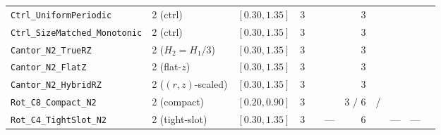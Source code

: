 \begin{table}[!htbp]
{\begin{tabular}{llccccrrrrr}
\texttt{Ctrl\_UniformPeriodic} & 2 (ctrl) & $[0.30, 1.35]$ & 3 & \NatureCtrlUniformperiodicFullToothPlanformAreaUmtwo{} & \NatureCtrlUniformperiodicFullToothPlanformPerimeterUm{} & 3 & \NatureCtrlUniformperiodicFRepPn{} & \NatureCtrlUniformperiodicFRepPnPerToothAreaUmtwo{} & \NatureCtrlUniformperiodicFRepPnPerToothPerimeterUm{} & \NatureCtrlUniformperiodicFAttPn{} \\
\texttt{Ctrl\_SizeMatched\_Monotonic} & 2 (ctrl) & $[0.30, 1.35]$ & 3 & \NatureCtrlSizematchedMonotonicFullToothPlanformAreaUmtwo{} & \NatureCtrlSizematchedMonotonicFullToothPlanformPerimeterUm{} & 3 & \NatureCtrlSizematchedMonotonicFRepPn{} & \NatureCtrlSizematchedMonotonicFRepPnPerToothAreaUmtwo{} & \NatureCtrlSizematchedMonotonicFRepPnPerToothPerimeterUm{} & \NatureCtrlSizematchedMonotonicFAttPn{} \\
\texttt{Cantor\_N2\_TrueRZ} & 2 ($H_2=H_1/3$) & $[0.30, 1.35]$ & 3 & \NatureCantorNtwoTruerzFullToothPlanformAreaUmtwo{} & \NatureCantorNtwoTruerzFullToothPlanformPerimeterUm{} & 3 & \NatureCantorNtwoTruerzFRepPn{} & \NatureCantorNtwoTruerzFRepPnPerToothAreaUmtwo{} & \NatureCantorNtwoTruerzFRepPnPerToothPerimeterUm{} & \NatureCantorNtwoTruerzFAttPn{} \\
\texttt{Cantor\_N2\_FlatZ} & 2 (flat-$z$) & $[0.30, 1.35]$ & 3 & \NatureCantorNtwoFlatzFullToothPlanformAreaUmtwo{} & \NatureCantorNtwoFlatzFullToothPlanformPerimeterUm{} & 3 & \NatureCantorNtwoFlatzFRepPn{} & \NatureCantorNtwoFlatzFRepPnPerToothAreaUmtwo{} & \NatureCantorNtwoFlatzFRepPnPerToothPerimeterUm{} & \NatureCantorNtwoFlatzFAttPn{} \\
\texttt{Cantor\_N2\_HybridRZ} & 2 ($(r,z)$-scaled) & $[0.30, 1.35]$ & 3 & \NatureCantorNtwoHybridrzFullToothPlanformAreaUmtwo{} & \NatureCantorNtwoHybridrzFullToothPlanformPerimeterUm{} & 3 & \NatureCantorNtwoHybridrzFRepPn{} & \NatureCantorNtwoHybridrzFRepPnPerToothAreaUmtwo{} & \NatureCantorNtwoHybridrzFRepPnPerToothPerimeterUm{} & \NatureCantorNtwoHybridrzFAttPn{} \\
\texttt{Rot\_C8\_Compact\_N2} & 2 (compact) & $[0.20, 0.90]$ & 3 & \NatureRotCeightCompactNtwoFullToothPlanformAreaUmtwo{} & \NatureRotCeightCompactNtwoFullToothPlanformPerimeterUm{} & 3 / 6 & \NatureRotCeightCompactNtwoFRepPn{} / \RotCeightCompactNtwoStandardThetaZerozerosixpzeroVectorDyadicFZPn{} & \NatureRotCeightCompactNtwoFRepPnPerToothAreaUmtwo{} & \NatureRotCeightCompactNtwoFRepPnPerToothPerimeterUm{} & \NatureRotCeightCompactNtwoFAttPn{} \\
\texttt{Rot\_C4\_TightSlot\_N2} & 2 (tight-slot) & $[0.30, 1.35]$ & 3 & \RotCfourTightslotNtwoHighThetaZerofoureightpzeroPolarOverlapUmtwo{} & --- & 6 & \RotCfourTightslotNtwoStandardThetaZerozerosixpzeroVectorDyadicFZPn{} & --- & --- & \RotCfourTightslotNtwoThetaFoureightStepEightFNetPn{} \\

\end{tabular}}
\end{table}
